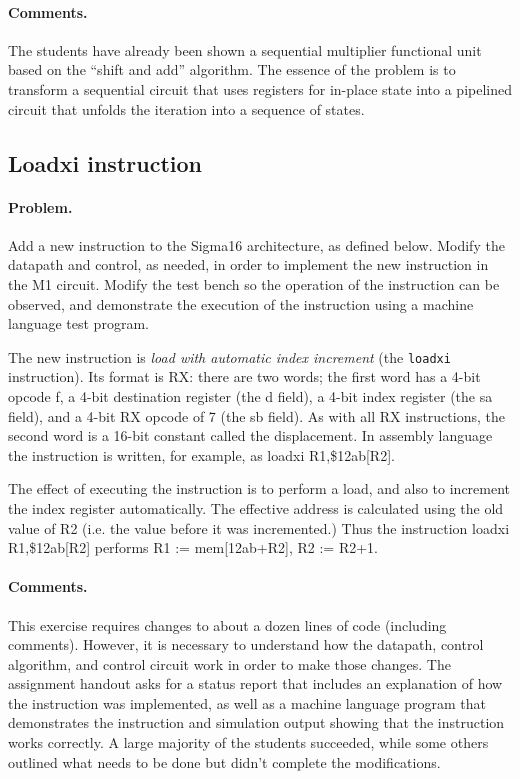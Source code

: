 \documentclass[submission,copyright,creativecommons]{eptcs}
\begin{document}
\paragraph{Comments.}
The students have already been shown a sequential multiplier
functional unit based on the ``shift and add'' algorithm.  The
essence of the problem is to transform a sequential circuit that
uses registers for in-place state into a pipelined circuit that
unfolds the iteration into a sequence of states.

\subsection{Loadxi instruction}

\paragraph{Problem.} Add a new instruction to the Sigma16
architecture, as defined below.  Modify the datapath and control,
as needed, in order to implement the new instruction in the M1
circuit.  Modify the test bench so the operation of the instruction
can be observed, and demonstrate the execution of the instruction
using a machine language test program.

The new instruction is \emph{load with automatic index increment}
(the \texttt{loadxi} instruction). Its format is RX: there are two
words; the first word has a 4-bit opcode f, a 4-bit destination
register (the d field), a 4-bit index register (the sa field), and
a 4-bit RX opcode of 7 (the sb field).  As with all RX
instructions, the second word is a 16-bit constant called the
displacement. In assembly language the instruction is written, for
example, as loadxi R1,\$12ab[R2].

The effect of executing the instruction is to perform a load, and
also to increment the index register automatically. The effective
address is calculated using the old value of R2 (i.e. the value
before it was incremented.)  Thus the instruction loadxi
R1,\$12ab[R2] performs R1 := mem[12ab+R2], R2 := R2+1.

\paragraph{Comments.}  This exercise requires changes to about a
dozen lines of code (including comments).  However, it is necessary
to understand how the datapath, control algorithm, and control
circuit work in order to make those changes.  The assignment
handout asks for a status report that includes an explanation of
how the instruction was implemented, as well as a machine language
program that demonstrates the instruction and simulation output
showing that the instruction works correctly.  A large majority of
the students succeeded, while some others outlined what needs to be
done but didn't complete the modifications.
\end{document}
